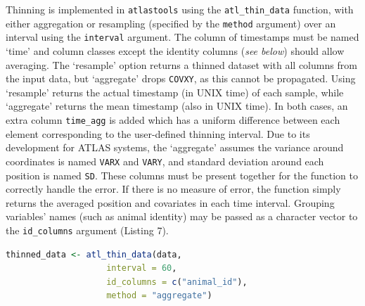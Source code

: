 \documentclass[10pt,paper=a4,headings=standardclasses
]{scrartcl}
\begin{document}
Thinning is implemented in \texttt{atlastools} using the \texttt{atl\_thin\_data} function, with either aggregation or resampling (specified by the \texttt{method} argument) over an interval using the \texttt{interval} argument.
The column of timestamps must be named `time' and column classes except the identity columns (\textit{see below}) should allow averaging.
The `resample' option returns a thinned dataset with all columns from the input data, but `aggregate' drops \texttt{COVXY}, as this cannot be propagated.
Using `resample' returns the actual timestamp (in UNIX time) of each sample, while `aggregate' returns the mean timestamp (also in UNIX time).
In both cases, an extra column \texttt{time\_agg} is added which has a uniform difference between each element corresponding to the user-defined thinning interval.
Due to its development for ATLAS systems, the `aggregate' assumes the variance around coordinates is named \texttt{VARX} and \texttt{VARY}, and standard deviation around each position is named \texttt{SD}.
These columns must be present together for the function to correctly handle the error.
If there is no measure of error, the function simply returns the averaged position and covariates in each time interval.
Grouping variables' names (such as animal identity) may be passed as a character vector to the \texttt{id\_columns} argument (Listing 7).

\begin{lstlisting}[float, language=R, style=customR, caption = {Code to thin data by aggregation in \texttt{atlastools}. The method can be either "aggregate" or "resample". 
The time interval is specified in seconds, while the \texttt{id\_columns} allows a character vector of column names to be passed to the function, with these columns used as identity variables.
Both methods return a dataset with as many rows as there are time-intervals.
While the resampling method retains all columns, the aggregation method drops the ATLAS specific columns specifying covariance in X and Y coordinates (COVXY), and location error (SD).}]
thinned_data <- atl_thin_data(data,
                    interval = 60,
                    id_columns = c("animal_id"),
                    method = "aggregate")
\end{lstlisting}
\end{document}
